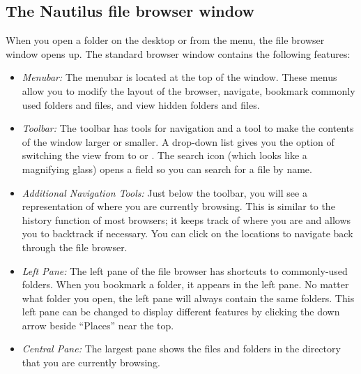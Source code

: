\subsection{The Nautilus file browser window}
When you open a folder on the desktop or from the  menu, the  file browser window
opens up. The standard browser window contains the following features:

\begin{itemize}
\item \textit{Menubar:} The menubar is located at the top of the window. These
  menus allow you to modify the layout of the browser, navigate,
  bookmark  commonly used folders and files, and view hidden folders
  and files.

\item \textit{Toolbar:} The toolbar has tools for navigation and a tool to make
  the contents of the window larger or smaller. A drop-down list gives you the
  option of switching the view from  to  or
  .  The search icon (which looks like a magnifying glass)
  opens a field so you can search for a file by name.

\item \textit{Additional Navigation Tools:}  Just below the toolbar, you will see a representation 
  of where you are currently browsing. This is similar to the history function 
  of most browsers; it keeps track of where you are and allows you to backtrack 
  if necessary.  You can click on the locations to navigate back through the 
  file browser.

\item \textit{Left Pane:} The left pane of the file browser has shortcuts to commonly-used
  folders. When you bookmark a folder, it appears in the left pane. No matter
  what folder you open, the left pane will always contain the same folders.
  This left pane can be changed to display different features by clicking the
  down arrow beside ``Places'' near the top.

\item \textit{Central Pane:} The largest pane shows the files and folders in the
  directory that you are currently browsing.
\end{itemize}

